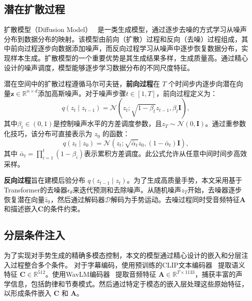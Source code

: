 \subsection{潜在扩散过程}
扩散模型（Diffusion Model）~\cite{ho2020ddpm} 是一类生成模型，通过逐步去噪的方式学习从噪声分布到数据分布的映射。该模型由前向（扩散）过程和反向（去噪）过程组成，其中前向过程逐步向数据添加噪声，而反向过程学习从噪声中逐步恢复数据分布，实现样本生成。扩散模型的一个重要优势是其生成结果多样，生成质量高。通过精心设计的噪声调度，模型能够逐步学习数据分布的不同尺度特征。

潜在空间中的扩散过程遵循马尔可夫链，\textbf{前向过程}在 $T$ 个时间步内逐步向潜在向量$\mathbf{z} \in \mathbb{R}^{n\times d}$添加高斯噪声。对于噪声步骤$t \in [1,T]$，前向过程定义为：
\begin{equation}
    q(z_t \mid z_{t-1}) = \mathcal{N}(z_t; \sqrt{1 - \beta_t} z_{t-1}, \beta_t \mathbf{I}),
  \end{equation}
其中$\beta_t \in (0,1)$是控制噪声水平的方差调度参数，且$z_T \sim \mathcal{N}(0, \mathbf{I})$。通过重参数化技巧，该分布可直接表示为 $z_0$ 的函数：
\begin{equation}
  q(z_t \mid z_0) = \mathcal{N}(z_t; \sqrt{\bar{\alpha}_t} z_0, (1 - \bar{\alpha}_t) \mathbf{I}),
\end{equation}
其中 $\bar{\alpha}_t = \prod_{i=1}^{t} (1 - \beta_i)$表示累积方差调度。此公式允许从任意中间时间步高效采样。

\textbf{反向过程}旨在建模后验分布 $q(z_{t-1} \mid z_t)$。为了生成高质量手势，本文采用基于Transformer的去噪器$\epsilon_\theta$来迭代预测和去除噪声。从随机噪声$z_T$开始，去噪器逐步恢复潜在向量$\hat{z}_0$，然后通过解码器$\mathcal{D}$解码为手势运动。去噪过程同时受音频特征$\mathbf{A}$和描述嵌入$\mathbf{C}$的条件约束。

\subsection{分层条件注入}
为了实现对手势生成的精确多模态控制，本文的模型通过精心设计的嵌入和分层注入过程整合多个条件。
对于字幕编码，使用预训练的CLIP文本编码器~\cite{radford2021clip} 提取语义特征 $\mathbf{C} \in \mathbb{R}^{512}$。使用WavLM编码器~\cite{chen2022wavlm} 提取音频特征 $\mathbf{A} \in \mathbb{R}^{T\times1133}$，捕获丰富的声学信息，包括韵律和节奏模式。然后通过特定于模态的嵌入层处理这些原始特征，以形成条件嵌入 $\mathbf{C}$ 和 $\mathbf{A}$。

